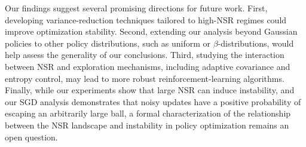 Our findings suggest several promising directions for future work. First, developing variance-reduction techniques tailored to high-NSR regimes could improve optimization stability. Second, extending our analysis beyond Gaussian policies to other policy distributions, such as uniform or $\beta$-distributions, would help assess the generality of our conclusions. Third, studying the interaction between NSR and exploration mechanisms, including adaptive covariance and entropy control, may lead to more robust reinforcement-learning algorithms. Finally, while our experiments show that large NSR can induce instability, and our SGD analysis demonstrates that noisy updates have a positive probability of escaping an arbitrarily large ball, a formal characterization of the relationship between the NSR landscape and instability in policy optimization remains an open question.
